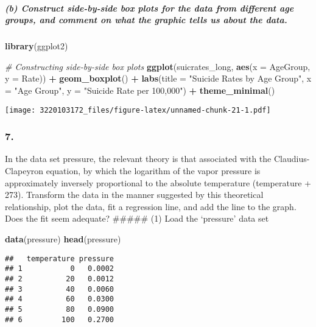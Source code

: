 \documentclass[
]{article}
\newenvironment{Shaded}{\begin{snugshade}}{\end{snugshade}}
\newcommand{\AttributeTok}[1]{\textcolor[rgb]{0.13,0.29,0.53}{#1}}
\newcommand{\CommentTok}[1]{\textcolor[rgb]{0.56,0.35,0.01}{\textit{#1}}}
\newcommand{\FunctionTok}[1]{\textcolor[rgb]{0.13,0.29,0.53}{\textbf{#1}}}
\newcommand{\NormalTok}[1]{#1}
\newcommand{\SpecialCharTok}[1]{\textcolor[rgb]{0.81,0.36,0.00}{\textbf{#1}}}
\newcommand{\StringTok}[1]{\textcolor[rgb]{0.31,0.60,0.02}{#1}}
\begin{document}
\subparagraph{(b) Construct side-by-side box plots for the data from
different age groups, and comment on what the graphic tells us about the
data.}\label{b-construct-side-by-side-box-plots-for-the-data-from-different-age-groups-and-comment-on-what-the-graphic-tells-us-about-the-data.}

\begin{Shaded}
\begin{Highlighting}[]
 \FunctionTok{library}\NormalTok{(ggplot2)}

\CommentTok{\# Constructing side{-}by{-}side box plots}
\FunctionTok{ggplot}\NormalTok{(suicrates\_long, }\FunctionTok{aes}\NormalTok{(}\AttributeTok{x =}\NormalTok{ AgeGroup, }\AttributeTok{y =}\NormalTok{ Rate)) }\SpecialCharTok{+}
  \FunctionTok{geom\_boxplot}\NormalTok{() }\SpecialCharTok{+}
  \FunctionTok{labs}\NormalTok{(}\AttributeTok{title =} \StringTok{"Suicide Rates by Age Group"}\NormalTok{,}
       \AttributeTok{x =} \StringTok{"Age Group"}\NormalTok{,}
       \AttributeTok{y =} \StringTok{"Suicide Rate per 100,000"}\NormalTok{) }\SpecialCharTok{+}
  \FunctionTok{theme\_minimal}\NormalTok{()}
\end{Highlighting}
\end{Shaded}

\texttt{[image: 3220103172\_files/figure-latex/unnamed-chunk-21-1.pdf]}

\subsubsection{7.}\label{section-6}

In the data set pressure, the relevant theory is that associated with
the Claudius- Clapeyron equation, by which the logarithm of the vapor
pressure is approximately inversely proportional to the absolute
temperature (temperature + 273). Transform the data in the manner
suggested by this theoretical relationship, plot the data, fit a
regression line, and add the line to the graph. Does the fit seem
adequate? \#\#\#\#\# (1) Load the `pressure' data set

\begin{Shaded}
\begin{Highlighting}[]
 \FunctionTok{data}\NormalTok{(pressure)}
\FunctionTok{head}\NormalTok{(pressure)}
\end{Highlighting}
\end{Shaded}

\begin{verbatim}
##   temperature pressure
## 1           0   0.0002
## 2          20   0.0012
## 3          40   0.0060
## 4          60   0.0300
## 5          80   0.0900
## 6         100   0.2700
\end{verbatim}
\end{document}
